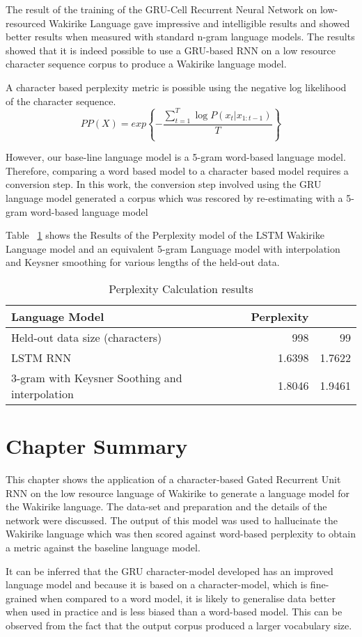 The result of the training of the GRU-Cell Recurrent Neural Network on low-resourced Wakirike Language gave impressive and intelligible results and showed better results when measured with standard n-gram language models. The results showed that it is indeed possible to use a GRU-based RNN on a low resource character sequence corpus to produce a Wakirike language model.

A character based perplexity metric is possible using  the negative log likelihood of the character sequence.
\begin{equation}
    PP(X)=exp\left\{−\frac{\sum_{t=1}^T\log P(x_t|x_{1:t−1})}{T}\right\}
\label{ch5_eq3_ppx}
\end{equation}

However, our base-line language model is a 5-gram word-based language model.  Therefore, comparing a word based model to a character based model requires a conversion step. In this work, the conversion step involved using the GRU language model generated a corpus which was rescored by re-estimating with a 5-gram word-based language model

Table ~\ref{tab:example} shows the Results of the Perplexity model of the LSTM Wakirike Language model and an equivalent 5-gram Language model with interpolation and Keysner smoothing \citep{Heafield-estimate} for various lengths of the held-out data.


\begin{table}
  \caption{Perplexity Calculation results}
  \label{tab:example}
\begin{tabular}{lrr}
\toprule
Language Model & Perplexity  \\
\midrule
Held-out data size (characters) & 998 & 99\\
\midrule
LSTM RNN & 1.6398 & 1.7622\\
3-gram with Keysner Soothing and interpolation & 1.8046 & 1.9461\\
\bottomrule
\end{tabular}
\end{table}
\section{Chapter Summary}
This chapter shows the application of a character-based Gated Recurrent Unit RNN on the low resource language of Wakirike to generate a language model for the Wakirike language.  The data-set and preparation and the details of the network were discussed.  The output of this model was used to hallucinate the Wakirike language which was then scored against word-based perplexity to obtain a metric against the baseline language model.

It can be inferred that the GRU character-model developed has an improved language model and because it is based on a character-model, which is fine-grained when compared to a word model, it is likely to generalise data better when used in practice and is less biased than a word-based model.  This can be observed from the fact that the output corpus produced a larger vocabulary size.
